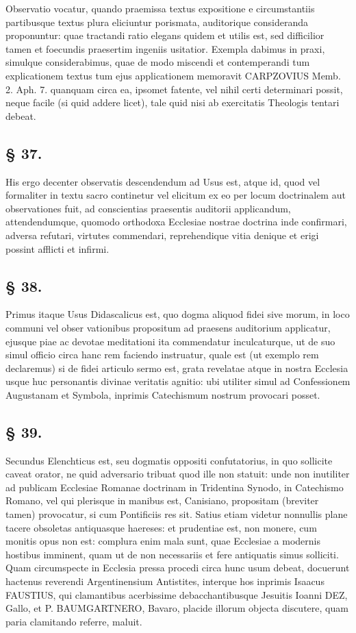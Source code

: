 Observatio vocatur, quando praemissa textus expositione e circumstantiis partibusque textus plura eliciuntur porismata, auditorique consideranda proponuntur: quae tractandi ratio elegans quidem et utilis est, sed difficilior tamen et foecundis praesertim ingeniis usitatior. Exempla dabimus in praxi, simulque considerabimus, quae de modo miscendi et contemperandi tum explicationem textus tum ejus applicationem memoravit CARPZOVIUS Memb. 2. Aph. 7. quanquam circa ea, ipsomet fatente, vel nihil certi determinari possit, neque facile (si quid addere licet), tale quid nisi ab exercitatis Theologis tentari debeat.

\subsection*{§ 37.}

His ergo decenter observatis descendendum ad Usus est, atque id, quod vel formaliter in textu sacro continetur vel elicitum ex eo per locum doctrinalem aut observationes fuit, ad conscientias praesentis auditorii applicandum, attendendumque, quomodo orthodoxa Ecclesiae nostrae doctrina inde confirmari, adversa refutari, virtutes commendari, reprehendique vitia denique et erigi possint afflicti et infirmi.

\subsection*{§ 38.}

Primus itaque Usus Didascalicus est, quo dogma aliquod fidei sive morum, in loco communi vel obser%
vationibus propositum ad praesens auditorium applicatur, ejusque piae ac devotae meditationi ita commendatur inculcaturque, ut de suo simul officio circa hanc rem faciendo instruatur, quale est (ut exemplo rem declaremus) si de fidei articulo sermo est, grata revelatae atque in nostra Ecclesia usque huc personantis divinae veritatis agnitio: ubi utiliter simul ad Confessionem Augustanam et Symbola, inprimis Catechismum nostrum provocari posset.

\subsection*{§ 39.}

Secundus Elenchticus est, seu dogmatis oppositi confutatorius, in quo sollicite caveat orator, ne quid adversario tribuat quod ille non statuit: unde non inutiliter ad publicam Ecclesiae Romanae doctrinam in Tridentina Synodo, in Catechismo Romano, vel qui plerisque in manibus est, Canisiano, propositam (breviter tamen) provocatur, si cum Pontificiis res sit. Satius etiam videtur nonnullis plane tacere obsoletas antiquasque haereses: et prudentiae est, non monere, cum monitis opus non est: complura enim mala sunt, quae Ecclesiae a modernis hostibus imminent, quam ut de non necessariis et fere antiquatis simus solliciti. Quam circumspecte in Ecclesia pressa procedi circa hunc usum debeat, docuerunt hactenus reverendi Argentinensium Antistites, interque hos inprimis Isaacus FAUSTIUS, qui clamantibus acerbissime debacchantibusque Jesuitis Ioanni DEZ, Gallo, et P. BAUMGARTNERO, Bavaro, placide illorum objecta discutere, quam paria clamitando referre, maluit.

